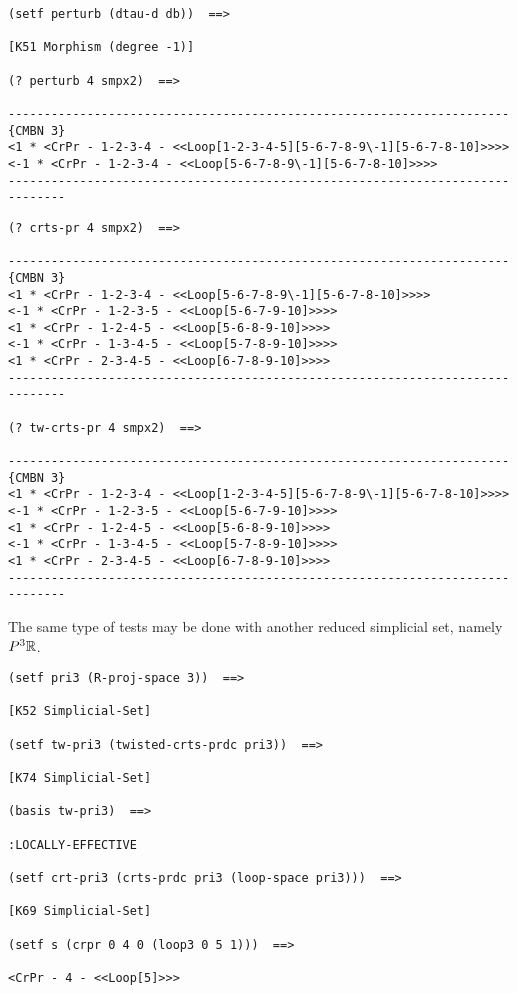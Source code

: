 {\footnotesize\begin{verbatim}
(setf perturb (dtau-d db))  ==>

[K51 Morphism (degree -1)]

(? perturb 4 smpx2)  ==>

----------------------------------------------------------------------{CMBN 3}
<1 * <CrPr - 1-2-3-4 - <<Loop[1-2-3-4-5][5-6-7-8-9\-1][5-6-7-8-10]>>>>
<-1 * <CrPr - 1-2-3-4 - <<Loop[5-6-7-8-9\-1][5-6-7-8-10]>>>>
------------------------------------------------------------------------------
\end{verbatim}}
\newpage
{\footnotesize\begin{verbatim}
(? crts-pr 4 smpx2)  ==>

----------------------------------------------------------------------{CMBN 3}
<1 * <CrPr - 1-2-3-4 - <<Loop[5-6-7-8-9\-1][5-6-7-8-10]>>>>
<-1 * <CrPr - 1-2-3-5 - <<Loop[5-6-7-9-10]>>>>
<1 * <CrPr - 1-2-4-5 - <<Loop[5-6-8-9-10]>>>>
<-1 * <CrPr - 1-3-4-5 - <<Loop[5-7-8-9-10]>>>>
<1 * <CrPr - 2-3-4-5 - <<Loop[6-7-8-9-10]>>>>
------------------------------------------------------------------------------

(? tw-crts-pr 4 smpx2)  ==>

----------------------------------------------------------------------{CMBN 3}
<1 * <CrPr - 1-2-3-4 - <<Loop[1-2-3-4-5][5-6-7-8-9\-1][5-6-7-8-10]>>>>
<-1 * <CrPr - 1-2-3-5 - <<Loop[5-6-7-9-10]>>>>
<1 * <CrPr - 1-2-4-5 - <<Loop[5-6-8-9-10]>>>>
<-1 * <CrPr - 1-3-4-5 - <<Loop[5-7-8-9-10]>>>>
<1 * <CrPr - 2-3-4-5 - <<Loop[6-7-8-9-10]>>>>
------------------------------------------------------------------------------
\end{verbatim}}
The same type of tests may be done with another reduced simplicial set, namely $P^3{{\mathbb{R}}}$.
{\footnotesize\begin{verbatim}
(setf pri3 (R-proj-space 3))  ==>

[K52 Simplicial-Set]

(setf tw-pri3 (twisted-crts-prdc pri3))  ==>

[K74 Simplicial-Set]

(basis tw-pri3)  ==>

:LOCALLY-EFFECTIVE

(setf crt-pri3 (crts-prdc pri3 (loop-space pri3)))  ==>

[K69 Simplicial-Set]

(setf s (crpr 0 4 0 (loop3 0 5 1)))  ==>

<CrPr - 4 - <<Loop[5]>>>
\end{verbatim}}
